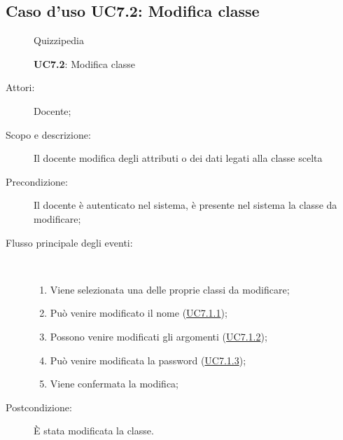 \subsection{Caso d'uso UC7.2: Modifica classe}
	\begin{figure}[H]
		\centering
		\begin{resizedtikzpicture}{\textwidth}
		\begin{umlsystem}[x=0, fill=lightgray!20]{Quizzipedia}
		\end{umlsystem}
		\end{resizedtikzpicture}
		\caption{\textbf{UC7.2}: Modifica classe}
		\label{UC7.2}
	\end{figure}
\begin{description}
\item[Attori:] Docente;
\item[Scopo e descrizione:] Il docente modifica degli attributi o dei dati legati alla classe scelta
      \item[Precondizione:] Il docente è autenticato nel sistema, è presente nel sistema la classe da modificare;

        \item[Flusso principale degli eventi:] \ 
 \begin{enumerate}
          \item Viene selezionata una delle proprie classi da modificare;
          \item Può venire modificato il nome (\hyperlink{UC7.1.1}{UC7.1.1});
          \item Possono venire modificati gli argomenti (\hyperlink{UC7.1.2}{UC7.1.2});
          \item Può venire modificata la password (\hyperlink{UC7.1.3}{UC7.1.3});
          \item Viene confermata la modifica;

      \end{enumerate}
    \item[Postcondizione:] È stata modificata la classe.
  \end{description}
\hypertarget{UC7.3}{}
